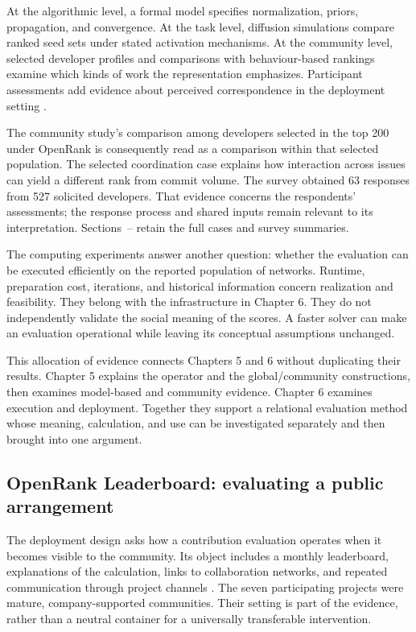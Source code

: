 At the algorithmic level, a formal model specifies normalization, priors, propagation, and convergence. At the task level, diffusion simulations compare ranked seed sets under stated activation mechanisms. At the community level, selected developer profiles and comparisons with behaviour-based rankings examine which kinds of work the representation emphasizes. Participant assessments add evidence about perceived correspondence in the deployment setting \citep{zhao2024}.

The community study's comparison among developers selected in the top 200 under OpenRank is consequently read as a comparison within that selected population. The selected coordination case explains how interaction across issues can yield a different rank from commit volume. The survey obtained 63 responses from 527 solicited developers. That evidence concerns the respondents' assessments; the response process and shared inputs remain relevant to its interpretation. Sections~-- retain the full cases and survey summaries.

The computing experiments answer another question: whether the evaluation can be executed efficiently on the reported population of networks. Runtime, preparation cost, iterations, and historical information concern realization and feasibility. They belong with the infrastructure in Chapter 6. They do not independently validate the social meaning of the scores. A faster solver can make an evaluation operational while leaving its conceptual assumptions unchanged.

This allocation of evidence connects Chapters 5 and 6 without duplicating their results. Chapter 5 explains the operator and the global/community constructions, then examines model-based and community evidence. Chapter 6 examines execution and deployment. Together they support a relational evaluation method whose meaning, calculation, and use can be investigated separately and then brought into one argument.

\subsection{OpenRank Leaderboard: evaluating a public arrangement}
The deployment design asks how a contribution evaluation operates when it becomes visible to the community. Its object includes a monthly leaderboard, explanations of the calculation, links to collaboration networks, and repeated communication through project channels \citep{zhao2024}. The seven participating projects were mature, company-supported communities. Their setting is part of the evidence, rather than a neutral container for a universally transferable intervention.

